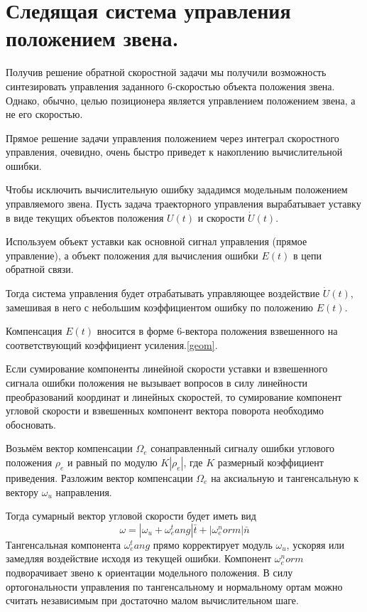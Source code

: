 \section{Следящая система управления положением звена.}

Получив решение обратной скоростной задачи мы получили возможность синтезировать управления заданного 6-скоростью объекта положения звена. Однако, обычно, целью позиционера является управлением положением звена, а не его скоростью.

Прямое решение задачи управления положением через интеграл скоростного управления, очевидно, очень быстро приведет к накоплению вычислительной ошибки.

Чтобы исключить вычислительную ошибку зададимся модельным положением управляемого звена. Пусть задача траекторного управления вырабатывает уставку в виде текущих объектов положения $U(t)$ и скорости $\dot{U}(t)$.

Используем объект уставки как основной сигнал управления (прямое управление), а объект положения для вычисления ошибки $E(t)$ в цепи обратной связи.

Тогда система управления будет отрабатывать управляющее воздействие $\dot{U}(t)$, замешивая в него с небольшим коэффициентом ошибку по положению $E(t)$.

Компенсация $E(t)$ вносится в форме 6-вектора положения взвешенного на соответствующий коэффициент усиления.\ref{geom}. 

Если сумирование компоненты линейной скорости уставки и взвешенного сигнала ошибки положения не вызывает вопросов в силу линейности преобразований координат и линейных скоростей, то сумирование компонент угловой скорости и взвешенных компонент вектора поворота необходимо обосновать.

Возьмём вектор компенсации $\Omega_e$ сонаправленный сигналу ошибки углового положения $\rho_e$ и равный по модулю $K|\rho_e|$, где $K$ размерный коэффициент приведения.
Разложим вектор компенсации $\Omega_e$ на аксиальную и тангенсальную к вектору $\omega_u$ направления.   

Тогда сумарный вектор угловой скорости будет иметь вид 
\begin{equation}
\omega = |\omega_u + \omega_e^tang|\bar{t} + |\omega_e^norm|\bar{n}
\end{equation} 
Тангенсальная компонента $\omega_e^tang$ прямо корректирует модуль $\omega_u$, ускоряя или замедляя воздействие исходя из текущей ошибки. Компонент $\omega_e^norm$ подворачивает звено к ориентации модельного положения. В силу ортогональности управления по тангенсальному и нормальному ортам можно считать независимым при достаточно малом вычислительном шаге.

